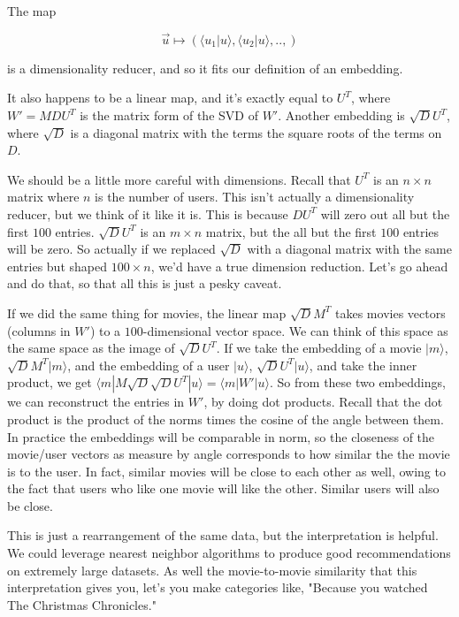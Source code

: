 \documentclass{amsbook}
\begin{document}
The map

$$
\vec u\mapsto\left(\langle u_1|u\rangle, \langle u_2|u\rangle, ..,\right)
$$

\noindent is a dimensionality reducer, and so it fits our definition of an embedding.

It also happens to be a linear map, and it's exactly equal to $U^T$, where $W'=MDU^T$ is the matrix form of the SVD of $W'$.  Another embedding is $\sqrt{D}U^T$, where $\sqrt{D}$ is a diagonal matrix with the terms the square roots of the terms on $D$.

We should be a little more careful with dimensions.  Recall that $U^T$ is an $n\times n$ matrix where $n$ is the number of users.  This isn't actually a dimensionality reducer, but we think of it like it is.  This is because $DU^T$ will zero out all but the first $100$ entries.  $\sqrt DU^T$ is an $m\times n$ matrix, but the all but the first $100$ entries will be zero.  So actually if we replaced $\sqrt D$ with a diagonal matrix with the same entries but shaped $100\times n$, we'd have a true dimension reduction.  Let's go ahead and do that, so that all this is just a pesky caveat.

If we did the same thing for movies, the linear map $\sqrt DM^T$ takes movies vectors (columns in $W'$) to a $100$-dimensional vector space.  We can think of this space as the same space as the image of $\sqrt DU^T$.  If we take the embedding of a movie $|m\rangle$, $\sqrt DM^T|m\rangle$, and the embedding of a user $|u\rangle$, $\sqrt DU^T|u\rangle$, and take the inner product, we get $\langle m|M\sqrt D\sqrt DU^T|u\rangle=\langle m|W'|u\rangle$.  So from these two embeddings, we can reconstruct the entries in $W'$, by doing dot products.  Recall that the dot product is the product of the norms times the cosine of the angle between them.  In practice the embeddings will be comparable in norm, so the closeness of the movie/user vectors as measure by angle corresponds to how similar the the movie is to the user.  In fact, similar movies will be close to each other as well, owing to the fact that users who like one movie will like the other.  Similar users will also be close.

This is just a rearrangement of the same data, but the interpretation is helpful.  We could leverage nearest neighbor algorithms to produce good recommendations on extremely large datasets.  As well the movie-to-movie similarity that this interpretation gives you, let's you make categories like, "Because you watched The Christmas Chronicles."
\end{document}
